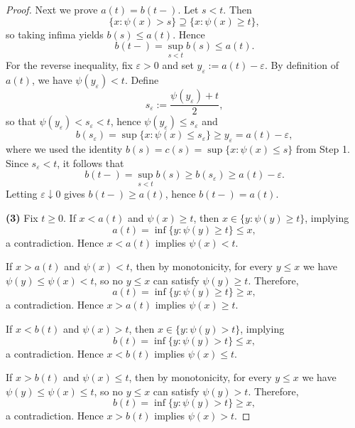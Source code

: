 \documentclass[12pt]{article}
\renewcommand{\(}{\left(}%
\renewcommand{\)}{\right)}%
\renewcommand{\[}{\left[}%
\renewcommand{\]}{\right]}%
\newtheorem{proof}{Proof.}}
\begin{document}
\begin{proof}
Next we prove $a(t)=b(t-)$. Let $s<t$. Then
\begin{equation*}
\{x:\psi(x)>s\}\supseteq \{x:\psi(x)\ge t\},
\end{equation*}
so taking infima yields $b(s)\le a(t)$. Hence
\begin{equation*}
b(t-)=\sup_{s<t}b(s)\le a(t).
\end{equation*}
For the reverse inequality, fix $\varepsilon>0$ and set $y_\varepsilon:=a(t)-\varepsilon$.
By definition of $a(t)$, we have $\psi(y_\varepsilon)<t$. Define
\begin{equation*}
s_\varepsilon:=\frac{\psi(y_\varepsilon)+t}{2},
\end{equation*}
so that $\psi(y_\varepsilon)<s_\varepsilon<t$, hence $\psi(y_\varepsilon)\le s_\varepsilon$ and
\begin{equation*}
b(s_\varepsilon)=\sup\{x:\psi(x)\le s_\varepsilon\}\ge y_\varepsilon=a(t)-\varepsilon,
\end{equation*}
where we used the identity $b(s)=c(s)=\sup\{x:\psi(x)\le s\}$ from Step 1.
Since $s_\varepsilon<t$, it follows that
\begin{equation*}
b(t-)=\sup_{s<t}b(s)\ge b(s_\varepsilon)\ge a(t)-\varepsilon.
\end{equation*}
Letting $\varepsilon\downarrow 0$ gives $b(t-)\ge a(t)$, hence $b(t-)=a(t)$.

\medskip \noindent \textbf{(3)}
Fix $t\ge 0$. If $x<a(t)$ and $\psi(x)\ge t$, then $x\in\{y:\psi(y)\ge t\}$, implying
\begin{equation*}
a(t)=\inf\{y:\psi(y)\ge t\}\le x,
\end{equation*}
a contradiction. Hence $x<a(t)$ implies $\psi(x)<t$.

If $x>a(t)$ and $\psi(x)<t$, then by monotonicity, for every $y\le x$ we have
$\psi(y)\le\psi(x)<t$, so no $y\le x$ can satisfy $\psi(y)\ge t$. Therefore,
\begin{equation*}
a(t)=\inf\{y:\psi(y)\ge t\}\ge x,
\end{equation*}
a contradiction. Hence $x>a(t)$ implies $\psi(x)\ge t$.

If $x<b(t)$ and $\psi(x)>t$, then $x\in\{y:\psi(y)>t\}$, implying
\begin{equation*}
b(t)=\inf\{y:\psi(y)>t\}\le x,
\end{equation*}
a contradiction. Hence $x<b(t)$ implies $\psi(x)\le t$.

If $x>b(t)$ and $\psi(x)\le t$, then by monotonicity, for every $y\le x$ we have
$\psi(y)\le\psi(x)\le t$, so no $y\le x$ can satisfy $\psi(y)>t$. Therefore,
\begin{equation*}
b(t)=\inf\{y:\psi(y)>t\}\ge x,
\end{equation*}
a contradiction. Hence $x>b(t)$ implies $\psi(x)>t$.


\end{proof}
\end{document}
